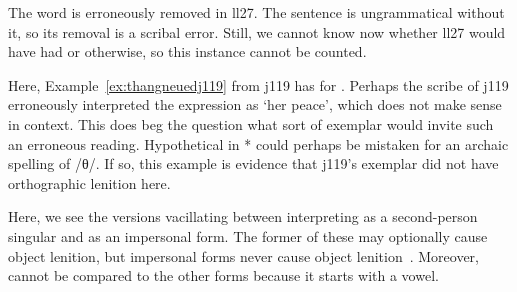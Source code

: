 \begin{mwl}
\end{mwl}
The word  is erroneously removed in \gls{ll27}. The sentence is ungrammatical without it, so its removal is a scribal error. Still, we cannot know now whether \gls{ll27} would have had  or  otherwise, so this instance cannot be counted.

\begin{mwl}
\end{mwl}
Here, Example~\ref{ex:thangneuedj119} from \gls{j119} has  for . Perhaps the scribe of \gls{j119} erroneously interpreted the expression as `her peace', which does not make sense in context. This does beg the question what sort of exemplar would invite such an erroneous reading. Hypothetical  in * could perhaps be mistaken for an archaic spelling of /θ/. If so, this example is evidence that \gls{j119}'s exemplar did not have orthographic lenition here.

\begin{mwl}
\end{mwl}
Here, we see the versions vacillating between interpreting  as a second-person singular and as an impersonal form. The former of these may optionally cause object lenition, but impersonal forms never cause object lenition~\autocite[67]{van_development14}. Moreover,  cannot be compared to the other forms because it starts with a vowel.

